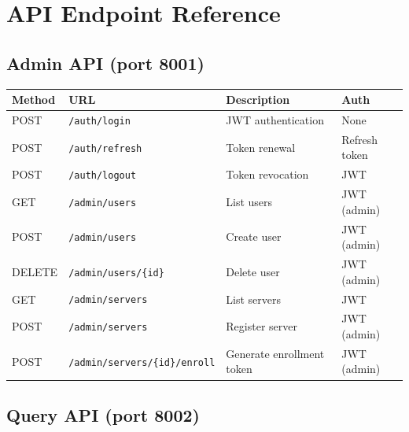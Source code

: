 \chapter{API Endpoint Reference}

\section{Admin API (port 8001)}

\begin{longtable}{llp{4.5cm}p{3.5cm}}
\toprule
\textbf{Method} & \textbf{URL} & \textbf{Description} & \textbf{Auth} \\
\midrule
\endhead
\bottomrule
\endfoot
POST   & \texttt{/auth/login}              & JWT authentication        & None \\
POST   & \texttt{/auth/refresh}            & Token renewal             & Refresh token \\
POST   & \texttt{/auth/logout}             & Token revocation          & JWT \\
GET    & \texttt{/admin/users}             & List users                & JWT (admin) \\
POST   & \texttt{/admin/users}             & Create user               & JWT (admin) \\
DELETE & \texttt{/admin/users/\{id\}}      & Delete user               & JWT (admin) \\
GET    & \texttt{/admin/servers}           & List servers              & JWT \\
POST   & \texttt{/admin/servers}           & Register server           & JWT (admin) \\
POST   & \texttt{/admin/servers/\{id\}/enroll} & Generate enrollment token & JWT (admin) \\
\end{longtable}

\section{Query API (port 8002)}

